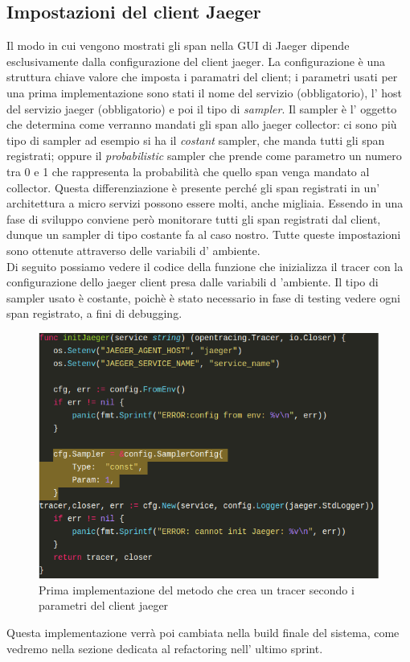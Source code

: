 \documentclass[a4paper,12pt,titlepage,italian,openany]{report}
\begin{document}
\subsection{Impostazioni del client Jaeger}
Il modo in cui vengono mostrati gli span nella GUI di Jaeger dipende esclusivamente dalla configurazione del client jaeger.
La configurazione è una struttura chiave valore che imposta i paramatri del client; i parametri usati per una prima implementazione sono stati il nome del servizio (obbligatorio), l' host del servizio jaeger (obbligatorio) e poi il tipo di \textit{sampler}. Il sampler è l' oggetto che determina come verranno mandati gli span allo jaeger collector:
ci sono più tipo di sampler ad esempio si ha il \textit{costant} sampler, che manda tutti gli span registrati; oppure il \textit{probabilistic} sampler che prende come parametro un numero tra 0 e 1 che rappresenta la probabilità che quello span venga mandato al collector. Questa differenziazione è presente perché gli span registrati in un' architettura a micro servizi possono essere molti, anche migliaia. Essendo in una fase di sviluppo conviene però monitorare tutti gli span registrati dal client, dunque un sampler di tipo costante fa al caso nostro.
Tutte queste impostazioni sono ottenute attraverso delle variabili d' ambiente.
\\ Di seguito possiamo vedere il codice della funzione che inizializza il tracer con la configurazione dello jaeger client presa dalle variabili d 'ambiente.
Il tipo di sampler usato è costante, poichè è stato necessario in fase di testing vedere ogni span registrato, a fini di debugging.
\begin{figure}[H]
    \includegraphics[scale=0.5]{92.png}
    \centering
    \caption{Prima implementazione del metodo che crea un tracer secondo i parametri del client jaeger}
\end{figure}  
Questa implementazione verrà poi cambiata nella build finale del sistema, come vedremo nella sezione dedicata al refactoring nell' ultimo sprint.
\end{document}

